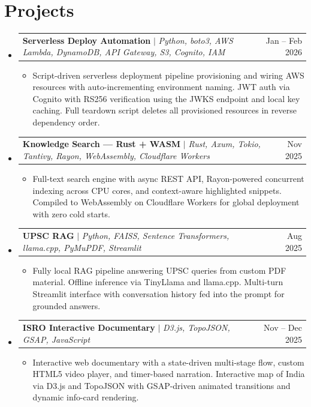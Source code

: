 \documentclass[letterpaper,11pt]{article}
\makeatletter
\newcommand{\resumeItem}[1]{
  \item\small{
    {#1 \vspace{-2pt}}
  }
}
\newcommand{\resumeProjectHeading}[2]{
    \item
    \begin{tabular*}{0.97\textwidth}{l@{\extracolsep{\fill}}r}
      \small#1 & #2 \\
    \end{tabular*}\vspace{-7pt}
}
\newcommand{\resumeSubHeadingListStart}{\begin{itemize}[leftmargin=0.15in, label={}]}
\newcommand{\resumeSubHeadingListEnd}{\end{itemize}}
\newcommand{\resumeItemListStart}{\begin{itemize}}
\newcommand{\resumeItemListEnd}{\end{itemize}\vspace{-5pt}}
\makeatother
\begin{document}
\section{Projects}
    \resumeSubHeadingListStart
      \resumeProjectHeading
          {\textbf{Serverless Deploy Automation} $|$ \emph{Python, boto3, AWS Lambda, DynamoDB, API Gateway, S3, Cognito, IAM}}{Jan -- Feb 2026}
          \resumeItemListStart
            \resumeItem{Script-driven serverless deployment pipeline provisioning and wiring AWS resources with auto-incrementing environment naming. JWT auth via Cognito with RS256 verification using the JWKS endpoint and local key caching. Full teardown script deletes all provisioned resources in reverse dependency order.}
          \resumeItemListEnd
      \resumeProjectHeading
          {\textbf{Knowledge Search --- Rust + WASM} $|$ \emph{Rust, Axum, Tokio, Tantivy, Rayon, WebAssembly, Cloudflare Workers}}{Nov 2025}
          \resumeItemListStart
            \resumeItem{Full-text search engine with async REST API, Rayon-powered concurrent indexing across CPU cores, and context-aware highlighted snippets. Compiled to WebAssembly on Cloudflare Workers for global deployment with zero cold starts.}
          \resumeItemListEnd
      \resumeProjectHeading
          {\textbf{UPSC RAG} $|$ \emph{Python, FAISS, Sentence Transformers, llama.cpp, PyMuPDF, Streamlit}}{Aug 2025}
          \resumeItemListStart
            \resumeItem{Fully local RAG pipeline answering UPSC queries from custom PDF material. Offline inference via TinyLlama and llama.cpp. Multi-turn Streamlit interface with conversation history fed into the prompt for grounded answers.}
          \resumeItemListEnd
      \resumeProjectHeading
          {\textbf{ISRO Interactive Documentary} $|$ \emph{D3.js, TopoJSON, GSAP, JavaScript}}{Nov -- Dec 2025}
          \resumeItemListStart
            \resumeItem{Interactive web documentary with a state-driven multi-stage flow, custom HTML5 video player, and timer-based narration. Interactive map of India via D3.js and TopoJSON with GSAP-driven animated transitions and dynamic info-card rendering.}
          \resumeItemListEnd
    \resumeSubHeadingListEnd

\end{document}
